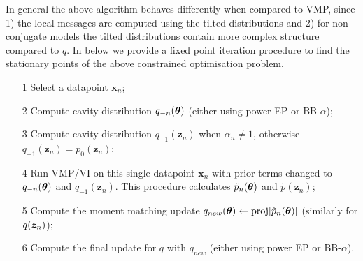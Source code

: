 In general the above algorithm behaves differently when compared to VMP, since 1) the local messages are computed using the tilted distributions and 2) for non-conjugate models the tilted distributions contain more complex structure compared to $q$.
%
In below we provide a fixed point iteration procedure to find the stationary points of the above constrained optimisation problem.
\begin{itemize}
    \item[1] Select a datapoint $\bm{x}_n$;
	\item[2] Compute cavity distribution $q_{-n}(\bm{\theta})$ (either using power EP or BB-$\alpha$);
	\item[3] Compute cavity distribution $q_{-1}(\bm{z}_n)$ when $\alpha_n \neq 1$, otherwise $q_{-1}(\bm{z}_n) = p_0(\bm{z}_n)$;
	\item[4] Run VMP/VI on this single datapoint $\bm{x}_n$ with prior terms changed to $q_{-n}(\bm{\theta})$ and $q_{-1}(\bm{z}_n)$. This procedure calculates $\tilde{p}_n(\bm{\theta})$ and $\tilde{p}(\bm{z}_n)$;
	\item[5] Compute the moment matching update $q_{new}(\bm{\theta}) \leftarrow \mathrm{proj}[\tilde{p}_n(\bm{\theta})]$ (similarly for $q(\bm{z}_n)$);
	\item[6] Compute the final update for $q$ with $q_{new}$ (either using power EP or BB-$\alpha$).
\end{itemize} 
